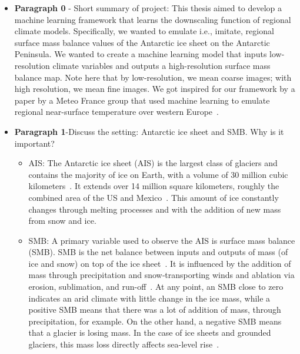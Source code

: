 \documentclass[a4paper,11pt,oneside]{report}
\begin{document}
 
\begin{itemize}
    
    \item \textbf{Paragraph 0} - Short summary of project: This thesis aimed to develop a machine learning framework that learns the downscaling function of regional climate models. Specifically, we wanted to emulate i.e., imitate, regional surface mass balance values of the Antarctic ice sheet on the Antarctic Peninsula. We wanted to create a machine learning model that inputs low-resolution climate variables and outputs a high-resolution surface mass balance map. Note here that by low-resolution, we mean coarse images; with high resolution, we mean fine images. We got inspired for our framework by a paper by a Meteo France group that used machine learning to emulate regional near-surface temperature over western Europe~\cite{Doury}.
    \item \textbf{Paragraph 1}-Discuss the setting: Antarctic ice sheet and SMB. Why is it important?
    \begin{itemize}
        \item AIS: The Antarctic ice sheet (AIS) is the largest class of glaciers and contains the majority of ice on Earth, with a volume of 30 million cubic kilometers~\cite{Icesheetsquick}. It extends over 14 million square kilometers, roughly the combined area of the US and Mexico~\cite{AntarcticIceSheet}. This amount of ice constantly changes through melting processes and with the addition of new mass from snow and ice.
        \item SMB: A primary variable used to observe the AIS is surface mass balance (SMB). SMB is the net balance between inputs and outputs of mass (of ice and snow) on top of the ice sheet~\cite{Lenaerts}. It is influenced by the addition of mass through precipitation and snow‐transporting winds and ablation via erosion, sublimation, and run-off~\cite{Kittel}. At any point, an SMB close to zero indicates an arid climate with little change in the ice mass, while a positive SMB means that there was a lot of addition of mass, through precipitation, for example. On the other hand, a negative SMB means that a glacier is losing mass. In the case of ice sheets and grounded glaciers, this mass loss directly affects sea-level rise~\cite{icesheet}. 
        

\end{itemize}
\end{itemize}
\end{document}
